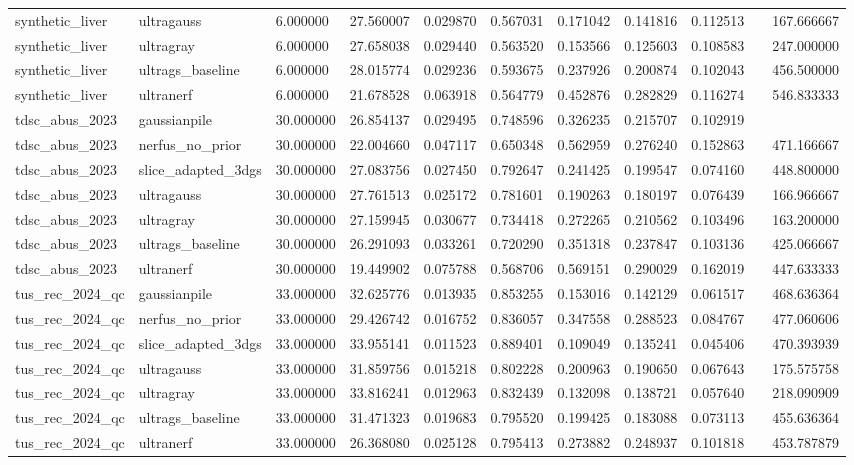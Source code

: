 \begin{tabular}{lllllllllll}
synthetic\_liver & ultragauss & 6.000000 & 27.560007 & 0.029870 & 0.567031 & 0.171042 & 0.141816 & 0.112513 &  & 167.666667 \\
synthetic\_liver & ultragray & 6.000000 & 27.658038 & 0.029440 & 0.563520 & 0.153566 & 0.125603 & 0.108583 &  & 247.000000 \\
synthetic\_liver & ultrags\_baseline & 6.000000 & 28.015774 & 0.029236 & 0.593675 & 0.237926 & 0.200874 & 0.102043 &  & 456.500000 \\
synthetic\_liver & ultranerf & 6.000000 & 21.678528 & 0.063918 & 0.564779 & 0.452876 & 0.282829 & 0.116274 &  & 546.833333 \\
tdsc\_abus\_2023 & gaussianpile & 30.000000 & 26.854137 & 0.029495 & 0.748596 & 0.326235 & 0.215707 & 0.102919 &  &  \\
tdsc\_abus\_2023 & nerfus\_no\_prior & 30.000000 & 22.004660 & 0.047117 & 0.650348 & 0.562959 & 0.276240 & 0.152863 &  & 471.166667 \\
tdsc\_abus\_2023 & slice\_adapted\_3dgs & 30.000000 & 27.083756 & 0.027450 & 0.792647 & 0.241425 & 0.199547 & 0.074160 &  & 448.800000 \\
tdsc\_abus\_2023 & ultragauss & 30.000000 & 27.761513 & 0.025172 & 0.781601 & 0.190263 & 0.180197 & 0.076439 &  & 166.966667 \\
tdsc\_abus\_2023 & ultragray & 30.000000 & 27.159945 & 0.030677 & 0.734418 & 0.272265 & 0.210562 & 0.103496 &  & 163.200000 \\
tdsc\_abus\_2023 & ultrags\_baseline & 30.000000 & 26.291093 & 0.033261 & 0.720290 & 0.351318 & 0.237847 & 0.103136 &  & 425.066667 \\
tdsc\_abus\_2023 & ultranerf & 30.000000 & 19.449902 & 0.075788 & 0.568706 & 0.569151 & 0.290029 & 0.162019 &  & 447.633333 \\
tus\_rec\_2024\_qc & gaussianpile & 33.000000 & 32.625776 & 0.013935 & 0.853255 & 0.153016 & 0.142129 & 0.061517 &  & 468.636364 \\
tus\_rec\_2024\_qc & nerfus\_no\_prior & 33.000000 & 29.426742 & 0.016752 & 0.836057 & 0.347558 & 0.288523 & 0.084767 &  & 477.060606 \\
tus\_rec\_2024\_qc & slice\_adapted\_3dgs & 33.000000 & 33.955141 & 0.011523 & 0.889401 & 0.109049 & 0.135241 & 0.045406 &  & 470.393939 \\
tus\_rec\_2024\_qc & ultragauss & 33.000000 & 31.859756 & 0.015218 & 0.802228 & 0.200963 & 0.190650 & 0.067643 &  & 175.575758 \\
tus\_rec\_2024\_qc & ultragray & 33.000000 & 33.816241 & 0.012963 & 0.832439 & 0.132098 & 0.138721 & 0.057640 &  & 218.090909 \\
tus\_rec\_2024\_qc & ultrags\_baseline & 33.000000 & 31.471323 & 0.019683 & 0.795520 & 0.199425 & 0.183088 & 0.073113 &  & 455.636364 \\
tus\_rec\_2024\_qc & ultranerf & 33.000000 & 26.368080 & 0.025128 & 0.795413 & 0.273882 & 0.248937 & 0.101818 &  & 453.787879 \\
\end{tabular}
